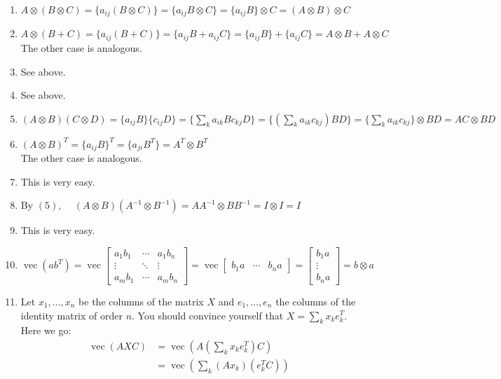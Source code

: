 \documentclass[a4paper,12pt]{article}
\begin{document}
\begin{enumerate}
    \item $A\otimes(B\otimes C) = \{a_{ij}(B\otimes C)\} = \{a_{ij}B\otimes C\} = \{a_{ij}B\}\otimes C = (A\otimes B)\otimes C $
    \item $A\otimes(B+C) = \{a_{ij}(B+C)\} = \{a_{ij}B + a_{ij}C\} = \{a_{ij}B\} + \{a_{ij}C\} = A\otimes B + A\otimes C$
    \\ The other case is analogous.
    \item See above.
    \item See above.
    \item $(A\otimes B)(C\otimes D) = \{a_{ij}B\}\{c_{ij}D\} = \{\sum_k a_{ik}B c_{kj}D\} = \{\left(\sum_k a_{ik}c_{kj}\right)BD\} = \{\sum_k a_{ik}c_{kj}\}\otimes BD = AC\otimes BD $
    \item $(A\otimes B)^T = \{a_{ij}B\}^T = \{a_{ji}B^T\} = A^T\otimes B^T$ \\ The other case is analogous.
    \item This is very easy.
    \item By $(5)$, $\quad(A\otimes B)(A^{-1}\otimes B^{-1}) = AA^{-1}\otimes BB^{-1} = I\otimes I = I$
    \item This is very easy.
    \item $
    \operatorname{vec}(ab^T) = \operatorname{vec}
      \begin{bmatrix}
      a_1b_1 & \cdots & a_1b_n \\
      \vdots & \ddots & \vdots \\
      a_mb_1 & \cdots & a_mb_n
      \end{bmatrix}
    = \operatorname{vec}
      \begin{bmatrix}
      b_1a & \cdots & b_na
      \end{bmatrix} =
      \begin{bmatrix}
      b_1a \\
      \vdots \\
      b_na
      \end{bmatrix} = b\otimes a
    $
    \item Let $x_1,\ldots,x_n$ be the columns of the matrix $X$ and $e_1,\ldots,e_n$ the columns of the identity matrix of order $n$. You should convince yourself that $X = \sum_k x_k e_k^T$. Here we go:
    $$
    \begin{align}
    \operatorname{vec}(AXC) &= \operatorname{vec}\left(A\left(\sum_k x_k e_k^T\right)C\right) \\
     &= \operatorname{vec}\left(\sum_k(Ax_k)(e_k^T C)\right) \\

\end{align}$$
\end{enumerate}
\end{document}
